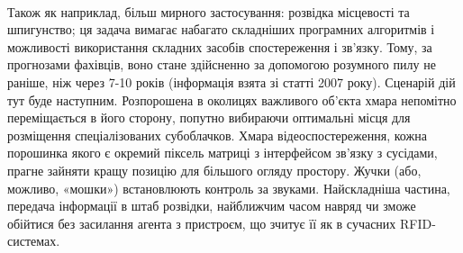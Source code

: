 \documentclass[aspectratio=169]{beamer}
\begin{document}
{\begin{frame}
{\begin{minipage}[h]{0.4\linewidth}
\end{minipage}\\
}
\small
Також як наприклад, більш мирного застосування: розвідка місцевості та шпигунство; ця задача вимагає набагато складніших програмних алгоритмів і можливості використання складних засобів спостереження і зв'язку. Тому, за прогнозами фахівців, воно стане здійсненно за допомогою розумного пилу не раніше, ніж через 7-10 років (інформація взята зі статті 2007 року). Сценарій дій тут буде наступним. Розпорошена в околицях важливого об'єкта хмара непомітно переміщається в його сторону, попутно вибираючи оптимальні місця для розміщення спеціалізованих субоблачков. Хмара відеоспостереження, кожна порошинка якого є окремий піксель матриці з інтерфейсом зв'язку з сусідами, прагне зайняти кращу позицію для більшого огляду простору. Жучки (або, можливо, «мошки») встановлюють контроль за звуками. Найскладніша частина, передача інформації в штаб розвідки, найближчим часом навряд чи зможе обійтися без засилання агента з пристроєм, що зчитує її як в сучасних RFID-системах.
\end{frame}
}
\end{document}
